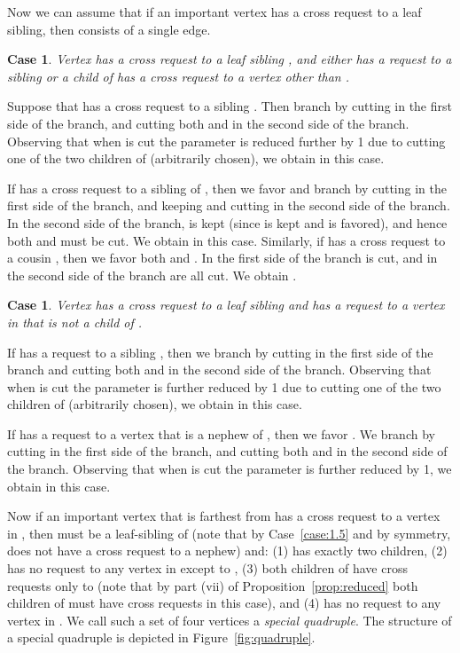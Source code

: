 \documentclass[11pt]{article}
\newtheorem{case}[theorem]{Case}
\begin{document}
Now we can assume that if an important vertex  has a cross request to a leaf sibling, then  consists of a single edge.

\begin{case}\label{case:5}
Vertex  has a cross request to a leaf sibling , and either  has a request to a sibling  or a child  of  has a cross request to a vertex other than .
\end{case}


Suppose that  has a cross request to a sibling . Then branch by cutting  in the first side of the branch, and cutting both  and  in the second side of the branch. Observing that when  is cut the parameter is reduced further by 1 due to cutting one of the two children of  (arbitrarily chosen), we obtain  in this case.

If  has a cross request to a sibling  of , then we favor  and branch by cutting  in the first
side of the branch, and keeping  and cutting  in the second side of the branch. In the second side of the branch,  is kept (since  is kept and is favored), and hence both  and  must be cut. We obtain  in this case. Similarly, if  has a cross request to a cousin , then we favor both  and . In the first side of the branch  is cut, and in the second side of the branch  are all cut. We obtain .

\begin{case}\label{case:6}
Vertex  has a cross request to a leaf sibling  and  has a request to a vertex in  that is not a child of .
\end{case}

If  has a request to a sibling , then we branch by cutting  in the first side of the branch and cutting both  and  in the second side of the branch. Observing that when  is cut the parameter is further reduced by 1 due to cutting one of the two children of  (arbitrarily chosen), we obtain  in this case.

If  has a request to a vertex  that is a nephew of , then we favor . We branch by cutting  in the first side of the branch, and cutting both  and  in the second side of the branch. Observing that when  is cut the parameter is further reduced by 1, we obtain  in this case.


Now if an important vertex  that is farthest from  has a cross request to a vertex  in , then  must be a leaf-sibling of  (note that by Case~\ref{case:1.5} and by symmetry,  does not have a cross request to a nephew) and: (1)  has exactly two children, (2)  has no request to any vertex in  except to , (3) both children of  have cross requests only to  (note that by part (vii) of Proposition~\ref{prop:reduced} both children of  must have cross requests in this case), and (4)  has no request to any vertex in . We call such a set of four vertices  a {\em special quadruple}. The structure of a special quadruple is depicted in Figure~\ref{fig:quadruple}.
\end{document}
